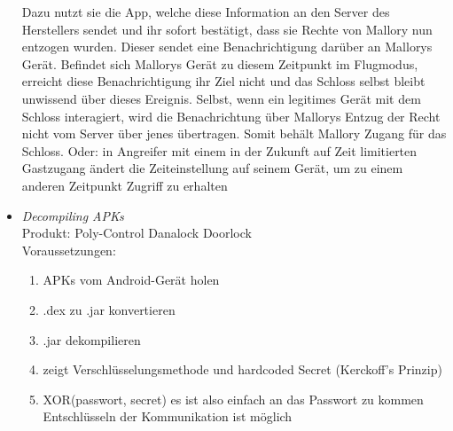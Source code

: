 \begin{itemize}[leftmargin=0cm,label={}]
                Dazu nutzt sie die App, welche diese Information an den Server des Herstellers sendet und ihr sofort bestätigt, dass sie Rechte von Mallory nun entzogen wurden. 
                Dieser sendet eine Benachrichtigung darüber an Mallorys Gerät. 
                Befindet sich Mallorys Gerät zu diesem Zeitpunkt im Flugmodus, erreicht diese Benachrichtigung ihr Ziel nicht und das Schloss selbst bleibt unwissend über dieses Ereignis. 
                Selbst, wenn ein legitimes Gerät mit dem Schloss interagiert, wird die Benachrichtung über Mallorys Entzug der Recht nicht vom Server über jenes übertragen.
                Somit behält Mallory Zugang für das Schloss. 
                Oder: in Angreifer mit einem in der Zukunft auf Zeit limitierten Gastzugang ändert die Zeiteinstellung auf seinem Gerät, um zu einem anderen Zeitpunkt Zugriff zu erhalten
            \item \emph{Decompiling APKs}\cite{Rose2016}\label{vuln:decompile}\\
                Produkt: Poly-Control Danalock Doorlock\\
                Voraussetzungen: \\  
                \begin{enumerate}[noitemsep]
    	            \item APKs vom Android-Gerät holen
    	            \item .dex zu .jar konvertieren
    	            \item .jar dekompilieren
    	            \item zeigt Verschlüsselungsmethode und hardcoded Secret (Kerckoff's Prinzip)
    	            \item XOR(passwort, secret) \textrightarrow es ist also einfach an das Passwort zu kommen \textrightarrow Entschlüsseln der Kommunikation ist möglich
    	        \end{enumerate}
        \end{itemize}
        
